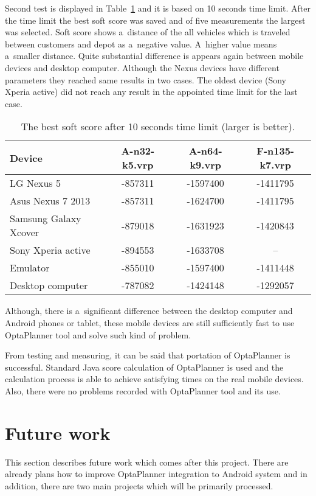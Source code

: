 Second test is displayed in Table~\ref{ScoreLimitTable} and it is based on 10 seconds time limit. After the time limit
the best soft score was saved and of five measurements the largest was selected. Soft score shows a~distance of the all
vehicles which is traveled between customers and depot as a~negative value. A~higher value means a~smaller distance.
Quite substantial difference is appears again between mobile devices and desktop computer. Although the Nexus devices
have different parameters they reached same results in two cases. The oldest device (Sony Xperia active) did not reach
any result in the appointed time limit for the last case.
\\
\begin{table}[h!]
    \begin{tabular}{|l|c|c|c|}
        \hline
        \textbf{Device} &
        \textbf{A-n32-k5.vrp} &
        \textbf{A-n64-k9.vrp} &
        \textbf{F-n135-k7.vrp} \\ \hline \hline
        LG Nexus 5            & -857311 & -1597400 & -1411795 \\ \hline
        Asus Nexus 7 2013     & -857311 & -1624700 & -1411795 \\ \hline
        Samsung Galaxy Xcover & -879018 & -1631923 & -1420843 \\ \hline
        Sony Xperia active    & -894553 & -1633708 & --       \\ \hline
        Emulator              & -855010 & -1597400 & -1411448 \\ \hline
        Desktop computer      & -787082 & -1424148 & -1292057 \\ \hline
    \end{tabular}
    \centering
    \caption{The best soft score after 10 seconds time limit (larger is better).}
    \label{ScoreLimitTable}
\end{table}

Although, there is a~significant difference between the desktop computer and Android phones or tablet, these mobile
devices are still sufficiently fast to use OptaPlanner tool and solve such kind of problem.

From testing and measuring, it can be said that portation of OptaPlanner is successful. Standard Java score calculation
of OptaPlanner is used and the calculation process is able to achieve satisfying times on the real mobile devices. Also,
there were no problems recorded with OptaPlanner tool and its use.

\section{Future work}\label{FutureWorkSection}
This section describes future work which comes after this project. There are already plans how to improve OptaPlanner
integration to Android system and in addition, there are two main projects which will be primarily processed.

